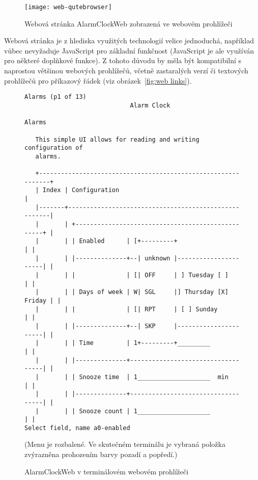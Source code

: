 \begin{figure}[htbp]
    \centering
    \texttt{[image: web-qutebrowser]}
    \caption{%
        Webová stránka AlarmClockWeb zobrazená ve webovém prohlížeči
    }
    \label{fig:web qutebrowser}
\end{figure}

Webová stránka je z hlediska využitých technologií velice jednoduchá, například
vůbec nevyžaduje JavaScript pro základní funkčnost (JavaScript je ale využíván
pro některé doplňkové funkce). Z tohoto důvodu by měla být kompatibilní
s naprostou většinou webových prohlížečů, včetně zastaralých verzí či textových
prohlížečů pro příkazový řádek (viz obrázek~\vref{fig:web links}).

\begin{figure}[htbp]
    \begin{lstlisting}[style=terminal,columns=fixed]
                                                    Alarms (p1 of 13) 
                             Alarm Clock                              
                                                                      
Alarms                                                                
                                                                      
   This simple UI allows for reading and writing configuration of     
   alarms.                                                            
                                                                      
   +--------------------------------------------------------------+   
   | Index | Configuration                                        |   
   |-------+------------------------------------------------------|   
   |       | +--------------------------------------------------+ |   
   |       | | Enabled      | [+---------+                      | |   
   |       | |--------------+--| unknown |----------------------| |   
   |       | |              | [| OFF     | ] Tuesday [ ]        | |   
   |       | | Days of week | W| SGL     |] Thursday [X] Friday | |   
   |       | |              | [| RPT     | [ ] Sunday           | |   
   |       | |--------------+--| SKP     |----------------------| |   
   |       | | Time         | 1+---------+_________             | |   
   |       | |--------------+-----------------------------------| |   
   |       | | Snooze time  | 1____________________  min        | |   
   |       | |--------------+-----------------------------------| |   
   |       | | Snooze count | 1____________________             | |   
Select field, name a0-enabled                                        
    \end{lstlisting}
    {\footnotesize (Menu  je rozbalené. Ve skutečném terminálu je
    vybraná položka zvýrazněna prohozením barvy pozadí a popředí.)}
    \caption{AlarmClockWeb v terminálovém webovém prohlížeči }
    \label{fig:web links}
\end{figure}

